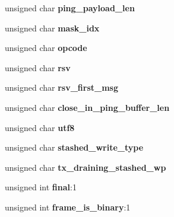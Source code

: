 \begin{DoxyCompactItemize}
unsigned char {\bfseries ping\+\_\+payload\+\_\+len}
\item 
\mbox{\label{struct__lws__websocket__related_a06ecf6b55a77f94b46b73fc83e680ed1}} 
unsigned char {\bfseries mask\+\_\+idx}
\item 
\mbox{\label{struct__lws__websocket__related_a0d78f77bbe1c6f6e3511cf5b7df28032}} 
unsigned char {\bfseries opcode}
\item 
\mbox{\label{struct__lws__websocket__related_a192fc1b92ab495be4a202b7b7054f188}} 
unsigned char {\bfseries rsv}
\item 
\mbox{\label{struct__lws__websocket__related_a9565090a6bbf0881f63f82fc9f83e0be}} 
unsigned char {\bfseries rsv\+\_\+first\+\_\+msg}
\item 
\mbox{\label{struct__lws__websocket__related_a4ae540bcb85c837b31311fc86740b809}} 
unsigned char {\bfseries close\+\_\+in\+\_\+ping\+\_\+buffer\+\_\+len}
\item 
\mbox{\label{struct__lws__websocket__related_abd103f3065cead04620f5a2e2c3fa90a}} 
unsigned char {\bfseries utf8}
\item 
\mbox{\label{struct__lws__websocket__related_a5775d679c35568af40d8db5d176d72d5}} 
unsigned char {\bfseries stashed\+\_\+write\+\_\+type}
\item 
\mbox{\label{struct__lws__websocket__related_ad629173bc0464b3576e97507be5be16f}} 
unsigned char {\bfseries tx\+\_\+draining\+\_\+stashed\+\_\+wp}
\item 
\mbox{\label{struct__lws__websocket__related_a003e49df1a0a68e375e2e68c970d6d27}} 
unsigned int {\bfseries final}\+:1
\item 
\mbox{\label{struct__lws__websocket__related_a1e34b32dbdd3fa4734a797d78492256a}} 
unsigned int {\bfseries frame\+\_\+is\+\_\+binary}\+:1
\item 

\end{DoxyCompactItemize}

